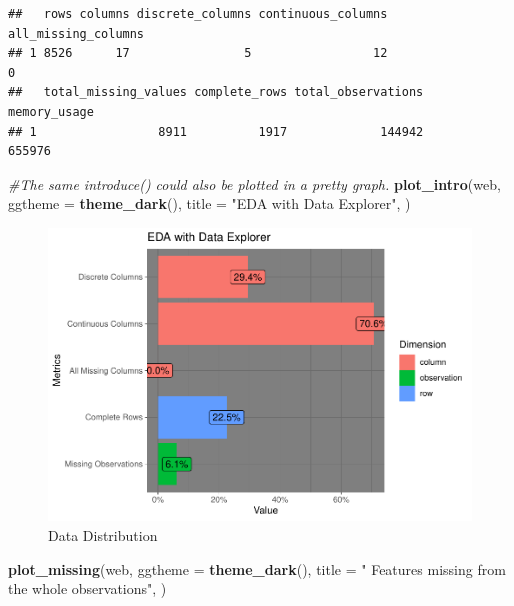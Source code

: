 \documentclass[
]{article}
\newenvironment{Shaded}{\begin{snugshade}}{\end{snugshade}}
\newcommand{\CommentTok}[1]{\textcolor[rgb]{0.56,0.35,0.01}{\textit{#1}}}
\newcommand{\DataTypeTok}[1]{\textcolor[rgb]{0.13,0.29,0.53}{#1}}
\newcommand{\KeywordTok}[1]{\textcolor[rgb]{0.13,0.29,0.53}{\textbf{#1}}}
\newcommand{\NormalTok}[1]{#1}
\newcommand{\StringTok}[1]{\textcolor[rgb]{0.31,0.60,0.02}{#1}}
\begin{document}
\begin{verbatim}
##   rows columns discrete_columns continuous_columns all_missing_columns
## 1 8526      17                5                 12                   0
##   total_missing_values complete_rows total_observations memory_usage
## 1                 8911          1917             144942       655976
\end{verbatim}

\begin{Shaded}
\begin{Highlighting}[]
\CommentTok{#The same introduce() could also be plotted in a pretty graph.}
\KeywordTok{plot_intro}\NormalTok{(web,  }\DataTypeTok{ggtheme =} \KeywordTok{theme_dark}\NormalTok{(),}
             \DataTypeTok{title =} \StringTok{"EDA with Data Explorer"}\NormalTok{,}
\NormalTok{             )}
\end{Highlighting}
\end{Shaded}

\begin{figure}

{\centering \includegraphics[width=0.75\linewidth]{report_files/figure-latex/Data Distribution-1} 

}

\caption{Data Distribution}\label{fig:Data Distribution}
\end{figure}

\begin{Shaded}
\begin{Highlighting}[]
\KeywordTok{plot_missing}\NormalTok{(web,  }
             \DataTypeTok{ggtheme =} \KeywordTok{theme_dark}\NormalTok{(),}
             \DataTypeTok{title =} \StringTok{" Features missing from the whole observations"}\NormalTok{,}
\NormalTok{             )}
\end{Highlighting}
\end{Shaded}
\end{document}

